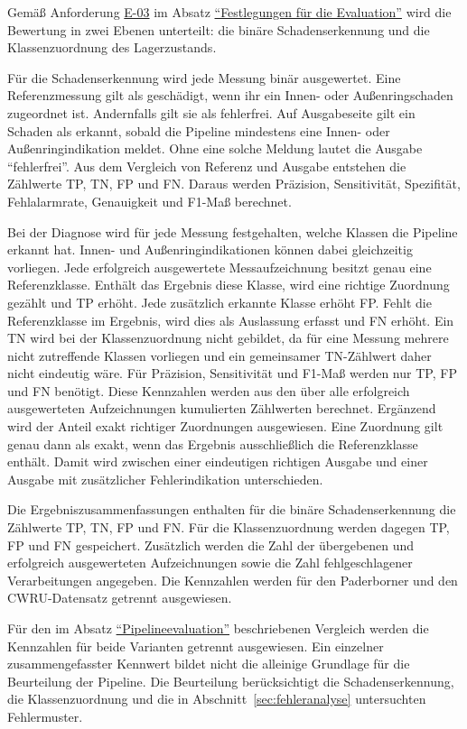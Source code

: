 
Gemäß Anforderung \hyperlink{req:E-03}{E-03} im Absatz
\hyperref[par:festlegungen_evaluation]{\enquote{Festlegungen für die
Evaluation}} wird die Bewertung in zwei Ebenen unterteilt: die binäre
Schadenserkennung und die Klassenzuordnung des Lagerzustands.

Für die Schadenserkennung wird jede Messung binär ausgewertet. Eine
Referenzmessung gilt als geschädigt, wenn ihr ein Innen- oder
Außenringschaden zugeordnet ist. Andernfalls gilt sie als fehlerfrei. Auf
Ausgabeseite gilt ein Schaden als erkannt, sobald die Pipeline mindestens eine
Innen- oder Außenringindikation meldet. Ohne eine solche Meldung lautet die
Ausgabe \enquote{fehlerfrei}. Aus dem Vergleich von Referenz und Ausgabe
entstehen die Zählwerte \gls{TP}, \gls{TN}, \gls{FP} und \gls{FN}. Daraus
werden Präzision, Sensitivität, Spezifität, Fehlalarmrate, Genauigkeit und
F1-Maß berechnet.

Bei der Diagnose wird für jede Messung festgehalten, welche Klassen die
Pipeline erkannt hat. Innen- und Außenringindikationen können dabei
gleichzeitig vorliegen. Jede erfolgreich ausgewertete Messaufzeichnung besitzt
genau eine Referenzklasse. Enthält das Ergebnis diese Klasse, wird eine richtige
Zuordnung gezählt und \gls{TP} erhöht. Jede zusätzlich erkannte Klasse erhöht
\gls{FP}. Fehlt die Referenzklasse im Ergebnis, wird dies als Auslassung erfasst
und \gls{FN} erhöht. Ein \gls{TN} wird bei der Klassenzuordnung nicht gebildet,
da für eine Messung mehrere nicht zutreffende Klassen vorliegen und ein
gemeinsamer TN-Zählwert daher nicht eindeutig wäre. Für Präzision,
Sensitivität und F1-Maß werden nur \gls{TP}, \gls{FP} und \gls{FN} benötigt.
Diese Kennzahlen werden aus den
über alle erfolgreich ausgewerteten Aufzeichnungen kumulierten Zählwerten
berechnet. Ergänzend wird
der Anteil exakt richtiger Zuordnungen ausgewiesen. Eine Zuordnung gilt genau
dann als exakt, wenn das Ergebnis ausschließlich die Referenzklasse enthält.
Damit wird zwischen einer eindeutigen richtigen Ausgabe und einer Ausgabe mit
zusätzlicher Fehlerindikation unterschieden.

Die Ergebniszusammenfassungen enthalten für die binäre Schadenserkennung die
Zählwerte \gls{TP}, \gls{TN}, \gls{FP} und \gls{FN}. Für die
Klassenzuordnung werden dagegen \gls{TP}, \gls{FP} und \gls{FN} gespeichert.
Zusätzlich werden die Zahl der übergebenen und erfolgreich ausgewerteten
Aufzeichnungen sowie die Zahl fehlgeschlagener Verarbeitungen angegeben. Die
Kennzahlen werden für den Paderborner und den CWRU-Datensatz getrennt
ausgewiesen.

Für den im Absatz
\hyperref[par:pipelineevaluation]{\enquote{Pipelineevaluation}} beschriebenen
Vergleich werden die Kennzahlen für beide Varianten getrennt ausgewiesen. Ein
einzelner zusammengefasster
Kennwert bildet nicht die alleinige Grundlage für die Beurteilung der Pipeline.
Die Beurteilung berücksichtigt die Schadenserkennung, die Klassenzuordnung und
die in Abschnitt~\ref{sec:fehleranalyse} untersuchten Fehlermuster.
